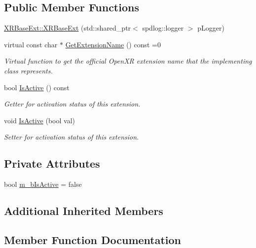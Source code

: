 \subsection*{Public Member Functions}
\begin{DoxyCompactItemize}
\item 
\mbox{\hyperlink{class_open_x_r_provider_1_1_x_r_base_ext_a8f59e68df5f1773152a3dfbe9ddc17fc}{X\+R\+Base\+Ext\+::\+X\+R\+Base\+Ext}} (std\+::shared\+\_\+ptr$<$ spdlog\+::logger $>$ p\+Logger)
\item 
virtual const char $\ast$ \mbox{\hyperlink{class_open_x_r_provider_1_1_x_r_base_ext_af23385b0dc226b0c4533a796ddc37352}{Get\+Extension\+Name}} () const =0
\begin{DoxyCompactList}\small\item\em Virtual function to get the official Open\+XR extension name that the implementing class represents. \end{DoxyCompactList}\item 
bool \mbox{\hyperlink{class_open_x_r_provider_1_1_x_r_base_ext_a40bce34f078349e639139ea85b630ac3}{Is\+Active}} () const
\begin{DoxyCompactList}\small\item\em Getter for activation status of this extension. \end{DoxyCompactList}\item 
void \mbox{\hyperlink{class_open_x_r_provider_1_1_x_r_base_ext_a19dd6d3922ebeb2f64402f2dcc23245b}{Is\+Active}} (bool val)
\begin{DoxyCompactList}\small\item\em Setter for activation status of this extension. \end{DoxyCompactList}\end{DoxyCompactItemize}
\subsection*{Private Attributes}
\begin{DoxyCompactItemize}
\item 
bool \mbox{\hyperlink{class_open_x_r_provider_1_1_x_r_base_ext_ac728d9cf808c7a2c6bb4913568d715c8}{m\+\_\+b\+Is\+Active}} = false
\end{DoxyCompactItemize}
\subsection*{Additional Inherited Members}


\subsection{Member Function Documentation}
\mbox{\label{class_open_x_r_provider_1_1_x_r_base_ext_af23385b0dc226b0c4533a796ddc37352}} 
